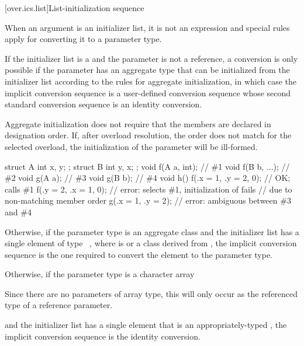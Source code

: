 [over.ics.list]{List-initialization sequence}

\pnum
When an argument is an initializer list, it is not an
expression and special rules apply for converting it to a parameter type.

\pnum
If the initializer list is a 
and the parameter is not a reference,
a conversion is only possible if
the parameter has an aggregate type
that can be initialized from the initializer list
according to the rules for aggregate initialization,
in which case the implicit conversion sequence is
a user-defined conversion sequence
whose second standard conversion sequence
is an identity conversion.
\begin{note}
Aggregate initialization does not require that
the members are declared in designation order.
If, after overload resolution, the order does not match
for the selected overload,
the initialization of the parameter will be ill-formed.
\begin{example}
\begin{codeblock}
struct A { int x, y; };
struct B { int y, x; };
void f(A a, int);               // \#1
void f(B b, ...);               // \#2
void g(A a);                    // \#3
void g(B b);                    // \#4
void h() {
  f({.x = 1, .y = 2}, 0);       // OK; calls \#1
  f({.y = 2, .x = 1}, 0);       // error: selects \#1, initialization of  fails
                                // due to non-matching member order
  g({.x = 1, .y = 2});          // error: ambiguous between \#3 and \#4
}
\end{codeblock}
\end{example}
\end{note}

\pnum
Otherwise,
if the parameter type is an aggregate class  and the initializer list has a
single element of type \cv{}~, where  is 
or a class derived from , the implicit conversion sequence is the one
required to convert the element to the parameter type.

\pnum
Otherwise, if the parameter type is a character array
\begin{footnote}
Since there are no parameters of array type,
this will only occur as the referenced type of a reference parameter.
\end{footnote}
and the initializer list has a single element that is an appropriately-typed
, the implicit conversion
sequence is the identity conversion.

